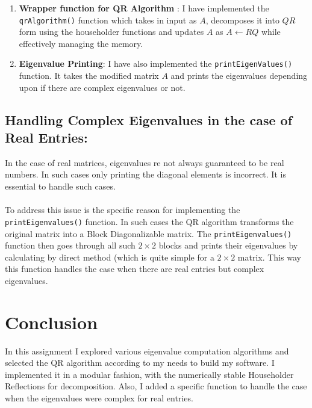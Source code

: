 \documentclass{article}
\begin{document}
\begin{enumerate}
\begin{itemize}
    \end{itemize}
    \item \textbf{Wrapper function for QR Algorithm} : I have implemented the \texttt{qrAlgorithm()} function which takes in input as $A$, decomposes it into $QR$ form using the householder functions and updates $A$ as $A \leftarrow R Q$ while effectively managing the memory.
    \item \textbf{Eigenvalue Printing}: I have also implemented the \texttt{printEigenValues()} function. It takes the modified matrix $A$ and prints the eigenvalues depending upon if there are complex eigenvalues or not.
\end{enumerate}

\subsection{Handling Complex Eigenvalues in the case of Real Entries:} \cite{libretexts}
In the case of real matrices, eigenvalues re not always guaranteed to be real numbers. In such cases only printing the diagonal elements is incorrect. It is essential to handle such cases.
\paragraph{} To address this issue is the specific reason for implementing the \texttt{printEigenvalues()} function. In such cases the QR algorithm transforms the original matrix into a Block Diagonalizable matrix. The \texttt{printEigenvalues()} function then goes through all such $2\times2$ blocks and prints their eigenvalues by calculating by direct method (which is quite simple for a $2\times2$ matrix. This way this function handles the case when there are real entries but complex eigenvalues.

\section{Conclusion}
In this assignment I explored various eigenvalue computation algorithms and selected the QR algorithm according to my needs to build my software. I implemented it in a modular fashion, with the numerically stable Householder Reflections for decomposition. Also, I added a specific function to handle the case when the eigenvalues were complex for real entries. 




\end{document}
